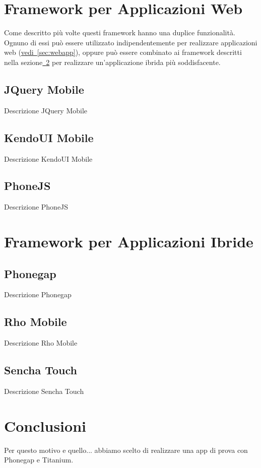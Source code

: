 	\section{Framework per Applicazioni Web}
	
	\label{sec:frameworkwebapp}
		Come descritto più volte questi framework hanno una duplice funzionalità.
		Ognuno di essi può essere utilizzato indipendentemente per realizzare
		applicazioni web (\hyperref[sec:webapp]{vedi~\ref{sec:webapp}}), oppure 
		può essere combinato ai framework descritti nella 
		sezione\hyperref[sec:frameworkhybrid]{~\ref{sec:frameworkhybrid}} per
		realizzare un'applicazione ibrida più soddisfacente. 
		\subsection{JQuery Mobile}
			Descrizione JQuery Mobile
	
		\subsection{KendoUI Mobile}
			Descrizione KendoUI Mobile
	
		\subsection{PhoneJS}
			Descrizione PhoneJS

			
	\section{Framework per Applicazioni Ibride}
	\label{sec:frameworkhybrid}
		\subsection{Phonegap}
			Descrizione Phonegap

		\subsection{Rho Mobile}
			Descrizione Rho Mobile

		\subsection{Sencha Touch}
			Descrizione Sencha Touch
	
	\section{Conclusioni}
		Per questo motivo e quello... abbiamo scelto di realizzare una app di 
		prova con Phonegap e Titanium.
